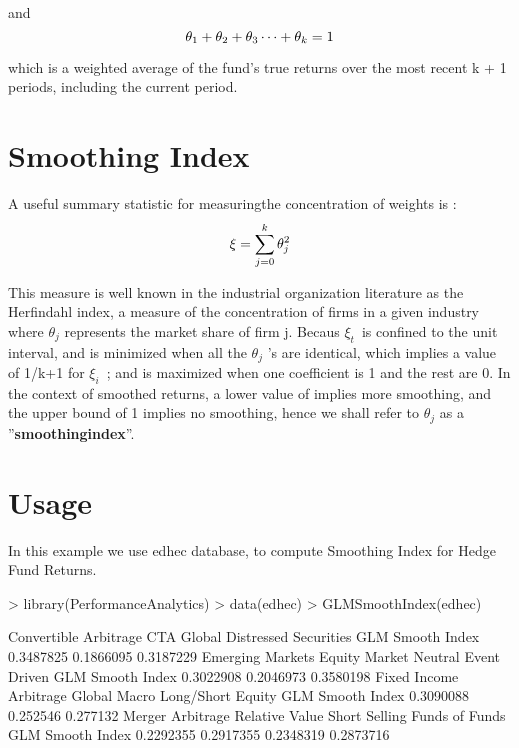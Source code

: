 \documentclass[12pt,letterpaper,english]{article}
\begin{document}
and 
\begin{equation}
\theta _1 + \theta _2 + \theta _3 \cdots + \theta _k = 1  \\
\end{equation}

which is a weighted average of the fund's true returns over the most recent k + 1
periods, including the current period.

\section{Smoothing Index}
A useful summary statistic for measuringthe concentration of weights is :
\begin{equation}
\xi =   \sum_{j=0}^{k} \theta _j^2 \\
\end{equation}

This measure is well known in the industrial organization literature as the Herfindahl index, a measure of the concentration of firms in a given industry where $\theta$\(_j\) represents the market share of firm j. Becaus $\xi_t$\ is confined to the unit interval, and is minimized when all the $\theta$\(_j\) 's are identical, which implies a value of 1/k+1 for $\xi_i$\ ; and is maximized when one coefficient is 1 and the rest are 0. In the context of smoothed returns, a lower value of implies more smoothing, and the upper bound of 1 implies no smoothing, hence we shall refer to $\theta$\(_j\) as a ''\textbf{smoothingindex}''.

\section{Usage}

In this example we use edhec database, to compute Smoothing Index for Hedge Fund Returns.
\begin{Schunk}
\begin{Sinput}
> library(PerformanceAnalytics)
> data(edhec)
> GLMSmoothIndex(edhec)
\end{Sinput}
\begin{Soutput}
                 Convertible Arbitrage CTA Global Distressed Securities
GLM Smooth Index             0.3487825  0.1866095             0.3187229
                 Emerging Markets Equity Market Neutral Event Driven
GLM Smooth Index        0.3022908             0.2046973    0.3580198
                 Fixed Income Arbitrage Global Macro Long/Short Equity
GLM Smooth Index              0.3090088     0.252546          0.277132
                 Merger Arbitrage Relative Value Short Selling Funds of Funds
GLM Smooth Index        0.2292355      0.2917355     0.2348319      0.2873716
\end{Soutput}
\end{Schunk}
\end{document}
